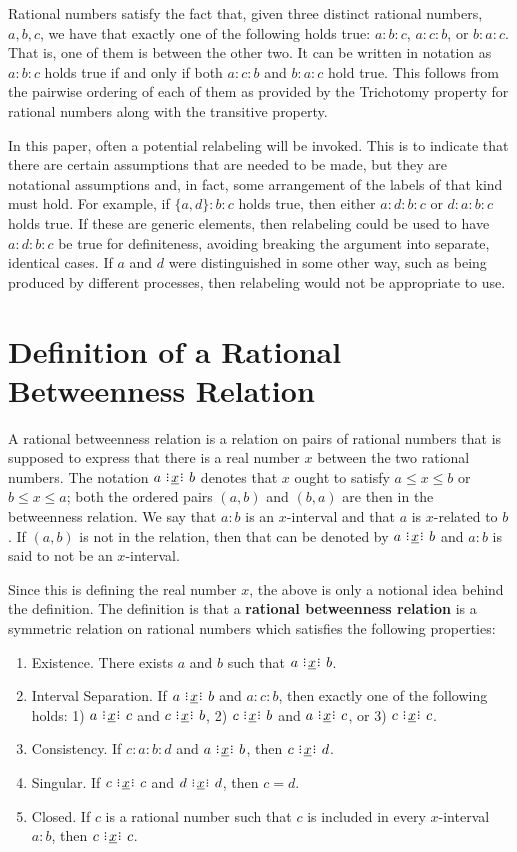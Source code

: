 \documentclass[12pt]{article}
\begin{document}
Rational numbers satisfy the fact that, given three distinct rational numbers, $a, b, c$, we have that exactly one of the following holds true: $a:b:c$, $a:c:b$, or $b:a:c$. That is, one of them is between the other two. It can be written in notation as $a:b:c$ holds true if and only if both \sout{$a:c:b$} and \sout{$b:a:c$} hold true. This follows from the pairwise ordering of each of them as provided by the Trichotomy property for rational numbers along with the transitive property. 

In this paper, often a potential relabeling will be invoked. This is to indicate that there are certain assumptions that are needed to be made, but they are notational assumptions and, in fact, some arrangement of the labels of that kind must hold. For example, if $\{a,d\}:b:c$ holds true, then either $a:d:b:c$ or $d:a:b:c$ holds true. If these are generic elements, then relabeling could be used to have $a:d:b:c$  be  true for definiteness, avoiding breaking the argument into separate, identical cases. If $a$ and $d$ were distinguished in some other way, such as being produced by different processes, then relabeling would not be appropriate to use. 

\section{Definition of a Rational Betweenness Relation}

A rational betweenness relation is a relation on pairs of rational numbers that is supposed to express that there is a real number $x$ between the two rational numbers. The notation $a \xrel b$ denotes that $x$ ought to satisfy $a \leq x \leq b$ or $b \leq x \leq a$;  both the ordered pairs $(a,b)$ and $(b,a)$ are then in the betweenness relation. We say that $a:b$ is an $x$-interval and that $a$ is $x$-related to $b$. If $(a,b)$ is not in the relation, then that can be denoted by \sout{$a \xrel b$} and $a:b$ is said to not be an $x$-interval. 

Since this is defining the real number $x$, the above is only a notional idea behind the definition. The definition is that a \textbf{rational betweenness relation} is a symmetric relation on rational numbers 
which satisfies the following properties:
\begin{enumerate}
    \item Existence. There exists $a$ and $b$ such that $a\xrel b$.
    \item Interval Separation. If $a \xrel b$ and $a : c : b$, then exactly one of the following holds: 1) $a \xrel c$ and \sout{$c \xrel b$}, 2) $c \xrel b$ and \sout{$a \xrel c$}, or 3) $c \xrel c$. 
    \item Consistency. If $c : a : b : d$ and $a \xrel b$, then $c \xrel d$. 
    \item Singular. If $c \xrel c$ and $d \xrel d$, then $c=d$. 
    \item Closed. If $c$ is a rational number such that $c$ is included in every $x$-interval $a:b$, then  $c \xrel c$. 
\end{enumerate}
\end{document}
